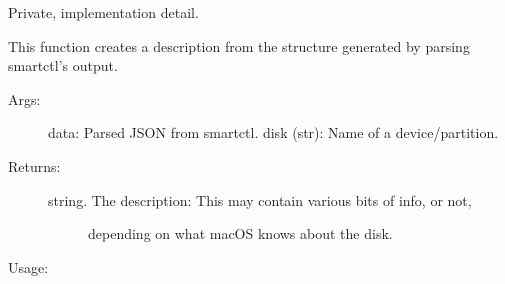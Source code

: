 \documentclass[letterpaper,10pt,english]{sphinxmanual}
\begin{document}
\begin{fulllineitems}
\label{\detokenize{cygwin:getdevinfo.cygwin.get_description}}
Private, implementation detail.

This function creates a description from the structure generated
by parsing smartctl’s output.
\begin{description}
\item[{Args:}] \leavevmode
data:         Parsed JSON from smartctl.
disk (str):   Name of a device/partition.

\item[{Returns:}] \leavevmode\begin{description}
\item[{string. The description: This may contain various bits of info, or not,}] \leavevmode
depending on what macOS knows about the disk.

\end{description}

\end{description}

Usage:

\begin{sphinxVerbatim}[commandchars=\\\{\}]
   
\end{sphinxVerbatim}

\end{fulllineitems}

\end{document}
